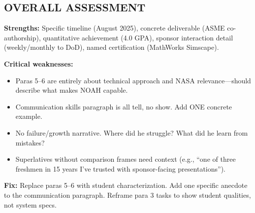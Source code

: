 \documentclass[12pt]{article}
\begin{document}
\subsection*{OVERALL ASSESSMENT}

\textbf{Strengths:} Specific timeline (August 2025), concrete deliverable (ASME co-authorship), quantitative achievement (4.0 GPA), sponsor interaction detail (weekly/monthly to DoD), named certification (MathWorks Simscape).

\textbf{Critical weaknesses:}
\begin{itemize}
\item Paras 5--6 are entirely about technical approach and NASA relevance---should describe what makes NOAH capable.
\item Communication skills paragraph is all tell, no show. Add ONE concrete example.
\item No failure/growth narrative. Where did he struggle? What did he learn from mistakes?
\item Superlatives without comparison frames need context (e.g., ``one of three freshmen in 15 years I've trusted with sponsor-facing presentations'').
\end{itemize}

\textbf{Fix:} Replace paras 5--6 with student characterization. Add one specific anecdote to the communication paragraph. Reframe para 3 tasks to show student qualities, not system specs.
\end{document}
